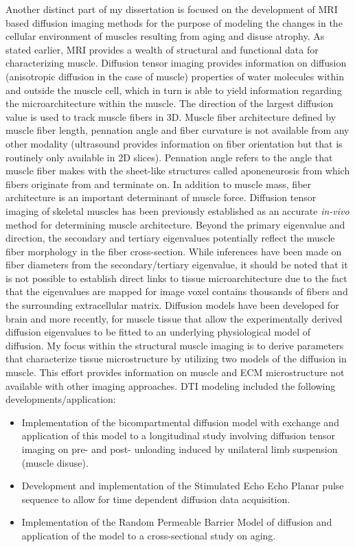 Another distinct part of my dissertation is focused on the development of MRI based diffusion imaging methods for the purpose of modeling the changes in the cellular environment of muscles resulting from aging and disuse atrophy.
As stated earlier, MRI provides a wealth of structural and functional data for characterizing muscle. 
Diffusion tensor imaging provides information on diffusion (anisotropic diffusion in the case of muscle) properties of water molecules within and outside the muscle cell, which in turn is able to yield information regarding the microarchitecture within the muscle. 
The direction of the largest diffusion value is used to track muscle fibers in 3D. 
Muscle fiber architecture defined by muscle fiber length, pennation angle and fiber curvature is not available from any other modality (ultrasound provides information on fiber orientation but that is routinely only available in 2D slices). 
Pennation angle refers to the angle that muscle fiber makes with the sheet-like structures called aponeneurosis from which fibers originate from and terminate on. 
In addition to muscle mass, fiber architecture is an important determinant of muscle force. 
Diffusion tensor imaging of skeletal muscles has been previously established as an accurate \textit{in-vivo} method for determining muscle architecture. 
Beyond the primary eigenvalue and direction, the secondary and tertiary eigenvalues potentially reflect the muscle fiber morphology in the fiber cross-section. 
While inferences have been made on fiber diameters from the secondary/tertiary eigenvalue, it should be noted that it is not possible to establish direct links to tissue microarchitecture due to the fact that the eigenvalues are mapped for image voxel contains thousands of fibers and the surrounding extracellular matrix. 
Diffusion models have been developed for brain and more recently, for muscle tissue that allow the experimentally derived diffusion eigenvalues to be fitted to an underlying physiological model of diffusion. 
My focus within the structural muscle imaging is to derive parameters that characterize tissue microstructure by utilizing two models of the diffusion in muscle. 
This effort provides information on muscle and ECM microstructure not available with other imaging approaches. 
DTI modeling included the following developments/application:
\begin{itemize}
\item Implementation of the bicompartmental diffusion model with exchange and application of this model to a longitudinal study involving diffusion tensor imaging on pre- and post- unloading induced by unilateral limb suspension (muscle disuse).
\item Development and implementation of the Stimulated Echo Echo Planar pulse sequence to allow for time dependent diffusion data acquisition.
\item Implementation of the Random Permeable Barrier Model of diffusion and application of the model to a cross-sectional study on aging.
\end{itemize}

